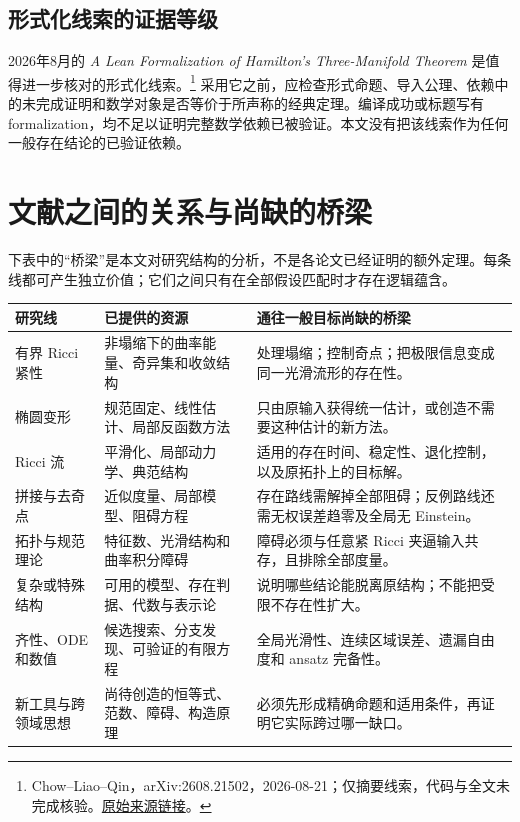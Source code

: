 \documentclass[11pt,a4paper]{article}
\theoremstyle{definition}
\newcommand{\src}[3]{\footnote{\raggedright #1，#2。\href{#3}{原始来源链接}。}}
\begin{document}
\subsection{形式化线索的证据等级}

2026年8月的 \emph{A Lean Formalization of Hamilton's Three-Manifold Theorem} 是值得进一步核对的形式化线索。\src{Chow--Liao--Qin}{arXiv:2608.21502，2026-08-21；仅摘要线索，代码与全文未完成核验}{https://arxiv.org/abs/2608.21502}
采用它之前，应检查形式命题、导入公理、依赖中的未完成证明和数学对象是否等价于所声称的经典定理。编译成功或标题写有 formalization，均不足以证明完整数学依赖已被验证。本文没有把该线索作为任何一般存在结论的已验证依赖。

\section{文献之间的关系与尚缺的桥梁}\label{sec:bridges}

下表中的“桥梁”是本文对研究结构的分析，不是各论文已经证明的额外定理。每条线都可产生独立价值；它们之间只有在全部假设匹配时才存在逻辑蕴含。

\begin{longtable}{P{0.18\textwidth}P{0.33\textwidth}P{0.40\textwidth}}
\toprule
研究线 & 已提供的资源 & 通往一般目标尚缺的桥梁\\\midrule\endhead
有界 Ricci 紧性 & 非塌缩下的曲率能量、奇异集和收敛结构 & 处理塌缩；控制奇点；把极限信息变成同一光滑流形的存在性。\\
椭圆变形 & 规范固定、线性估计、局部反函数方法 & 只由原输入获得统一估计，或创造不需要这种估计的新方法。\\
Ricci 流 & 平滑化、局部动力学、典范结构 & 适用的存在时间、稳定性、退化控制，以及原拓扑上的目标解。\\
拼接与去奇点 & 近似度量、局部模型、阻碍方程 & 存在路线需解掉全部阻碍；反例路线还需无权误差趋零及全局无 Einstein。\\
拓扑与规范理论 & 特征数、光滑结构和曲率积分障碍 & 障碍必须与任意紧 Ricci 夹逼输入共存，且排除全部度量。\\
复杂或特殊结构 & 可用的模型、存在判据、代数与表示论 & 说明哪些结论能脱离原结构；不能把受限不存在性扩大。\\
齐性、ODE和数值 & 候选搜索、分支发现、可验证的有限方程 & 全局光滑性、连续区域误差、遗漏自由度和 ansatz 完备性。\\
新工具与跨领域思想 & 尚待创造的恒等式、范数、障碍、构造原理 & 必须先形成精确命题和适用条件，再证明它实际跨过哪一缺口。\\\bottomrule
\end{longtable}
\end{document}
